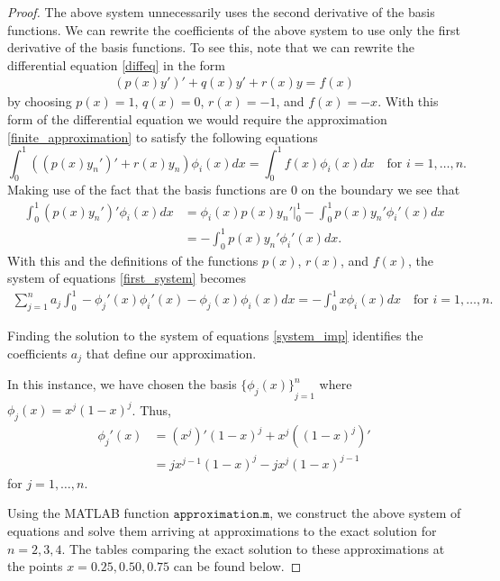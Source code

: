 \begin{proof}
  The above system unnecessarily uses the second derivative of the basis
  functions. We can rewrite the coefficients of the above system to use only
  the first derivative of the basis functions. To see this,
  note that we can rewrite the differential equation \eqref{diffeq} in the form
  \begin{align}\label{alternate_diffeq}
    (p(x)y')' + q(x)y' + r(x)y = f(x)
  \end{align}
  by choosing $p(x) = 1$, $q(x) = 0$, $r(x) = -1$, and $f(x) = -x$. With this form of the
  differential equation we would require the approximation \eqref{finite_approximation}
  to satisfy the following equations
  \[
    \int_0^1 ((p(x)y_n')' + r(x)y_n)\phi_i(x) dx = \int_0^1f(x)\phi_i(x)dx \quad \text{for $i=1,\dots,n$}.
  \]
  Making use of the fact that the basis functions are 0 on the boundary we see that
  \begin{align*}
    \int_0^1(p(x)y_n')'\phi_i(x) dx
    &= \phi_i(x)p(x)y_n'\rvert_0^1 - \int_0^1 p(x)y_n'\phi_i'(x) dx \\
    &= - \int_0^1 p(x)y_n'\phi_i'(x) dx.
  \end{align*}
  With this and the definitions of the functions $p(x)$, $r(x)$, and $f(x)$,
  the system of equations \eqref{first_system} becomes
  \begin{align}\label{system_imp}
    \sum_{j=1}^n a_j \int_0^1 -\phi_j'(x)\phi_i'(x) - \phi_j(x)\phi_i(x) dx = -\int_0^1 x \phi_i(x) dx \quad \text{for $i=1,\dots,n$}.
  \end{align}

  Finding the solution to the system of equations \eqref{system_imp} identifies
  the coefficients $a_j$ that define our approximation.

  In this instance, we have chosen the basis $\left.\{\phi_j(x)\}\right._{j=1}^n$ where $\phi_j(x) = x^j(1-x)^j$.
  Thus,
  \begin{align*}
    \phi_j'(x)
    &= \left(x^j\right)'(1-x)^j + x^j\left((1-x)^j\right)' \\
    &= jx^{j-1}(1-x)^j -jx^j(1-x)^{j-1}
  \end{align*}
  for $j=1,\dots,n$.

  Using the MATLAB function $\texttt{approximation.m}$, we construct the above
  system of equations and solve them arriving at approximations to the exact
  solution for $n=2,3,4$.
  The tables comparing the exact solution to these approximations at the
  points $x=0.25, 0.50, 0.75$ can be found below.


\end{proof}
